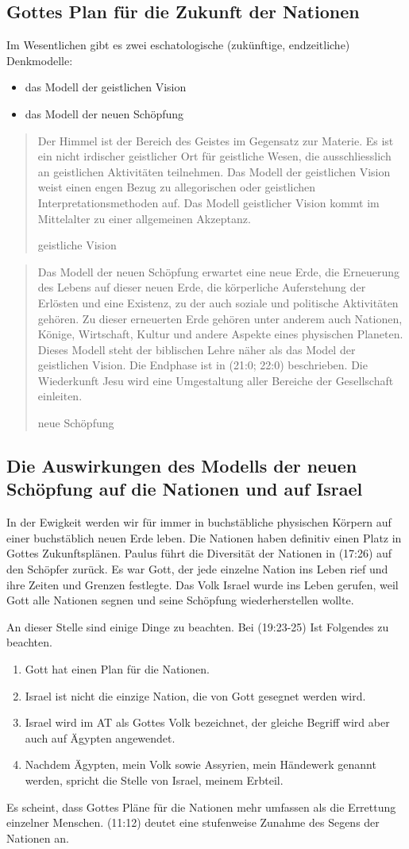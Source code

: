 \documentclass{../../inc/mybib}
\begin{document}
\subsection{Gottes Plan für die Zukunft der Nationen}
Im Wesentlichen gibt es zwei eschatologische (zukünftige, endzeitliche) Denkmodelle:
\begin{itemize}
    \item das Modell der geistlichen Vision
    \item das Modell der neuen Schöpfung
\end{itemize}
\blockquote[geistliche Vision]{Der Himmel ist der Bereich des Geistes im Gegensatz zur Materie. Es ist ein nicht irdischer geistlicher Ort für geistliche Wesen, die ausschliesslich an geistlichen Aktivitäten teilnehmen. Das Modell der geistlichen Vision weist einen engen Bezug zu allegorischen oder geistlichen Interpretationsmethoden auf. Das Modell geistlicher Vision kommt im Mittelalter zu einer allgemeinen Akzeptanz.}
\blockquote[neue Schöpfung]{Das Modell der neuen Schöpfung erwartet eine neue Erde, die Erneuerung des Lebens auf dieser neuen Erde, die körperliche Auferstehung der Erlösten und eine Existenz, zu der auch soziale und politische Aktivitäten gehören. Zu dieser erneuerten Erde gehören unter anderem auch Nationen, Könige, Wirtschaft, Kultur und andere Aspekte eines physischen Planeten. Dieses Modell steht der biblischen Lehre näher als das Model der geistlichen Vision. Die Endphase ist in (21:0; 22:0) beschrieben. Die Wiederkunft Jesu wird eine Umgestaltung aller Bereiche der Gesellschaft einleiten.}
\subsection{Die Auswirkungen des Modells der neuen Schöpfung auf die Nationen und auf Israel}
In der Ewigkeit werden wir für immer in buchstäbliche physischen Körpern auf einer buchstäblich neuen Erde leben. Die Nationen haben definitiv einen Platz in Gottes Zukunftsplänen. Paulus führt die Diversität der Nationen in (17:26) auf den Schöpfer zurück. Es war Gott, der jede einzelne Nation ins Leben rief und ihre Zeiten und Grenzen festlegte. Das Volk Israel wurde ins Leben gerufen, weil Gott alle Nationen segnen und seine Schöpfung wiederherstellen wollte.

An dieser Stelle sind einige Dinge zu beachten. 
Bei (19:23-25) Ist Folgendes zu beachten. 
\begin{enumerate}
    \item Gott hat einen Plan für die Nationen.
    \item Israel ist nicht die einzige Nation, die von Gott gesegnet werden wird.
    \item Israel wird im AT als Gottes Volk bezeichnet, der gleiche Begriff wird aber auch auf Ägypten angewendet.
    \item Nachdem Ägypten, mein Volk sowie Assyrien, mein Händewerk genannt werden, spricht die Stelle von Israel, meinem Erbteil.
\end{enumerate}
Es scheint, dass Gottes Pläne für die Nationen mehr umfassen als die Errettung einzelner Menschen. (11:12) deutet eine stufenweise Zunahme des Segens der Nationen an.
\end{document}
